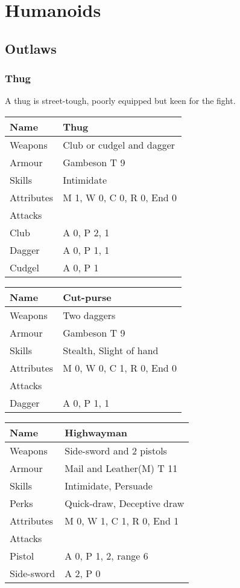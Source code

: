 \documentclass[a4paper,11pt,oneside]{book}
\newcommand{\textlf}[1]{\textbf{\titlecap{#1}}}
\begin{document}
\section{Humanoids}

\subsection{Outlaws}

\subsubsection{Thug}
A thug is street-tough, poorly equipped but keen for the fight. 

\begin{tabular}{|l|l|}
	\hline
	Name & Thug\\
	\hline
	Weapons & Club or cudgel and dagger\\
	Armour & Gambeson T 9\\
	Skills & Intimidate\\
	Attributes & M 1, W 0, C 0, R 0, End 0\\ 
	\hline
	Attacks & \\
	\hline
	Club & A 0, P 2, \textlf{penetration} 1\\
	Dagger & A 0, P 1, \textlf{Rending} 1 \\
	Cudgel & A 0, P 1\\ 
	\hline
\end{tabular}

\begin{tabular}{|l|l|}
	\hline
	Name & Cut-purse\\
	\hline
	Weapons & Two daggers\\
	Armour & Gambeson T 9\\
	Skills & Stealth, Slight of hand\\
	Attributes & M 0, W 0, C 1, R 0, End 0\\ 
	\hline
	Attacks & \\
	\hline
	Dagger & A 0, P 1, \textlf{Rending} 1 \\
	\hline
\end{tabular}

\begin{tabular}{|l|l|}
	\hline
	Name & Highwayman\\
	\hline
	Weapons & Side-sword and 2 pistols\\
	Armour & Mail and Leather(M) T 11\\
	Skills & Intimidate, Persuade\\
	Perks & Quick-draw, Deceptive draw \\
	Attributes & M 0, W 1, C 1, R 0, End 1\\ 
	\hline
	Attacks & \\
	\hline
	Pistol & A 0, P 1, \textlf{penetration} 2, range 6\\
	Side-sword & A 2, P 0 \\
	\hline
\end{tabular}
\end{document}
